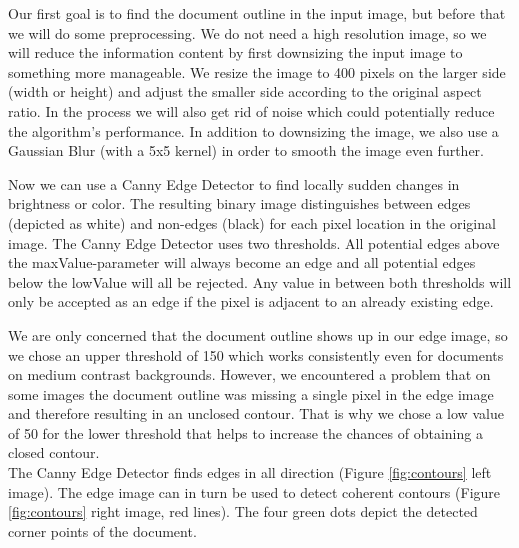 \documentclass[bibliography=totoc]{scrartcl}
\begin{document}
Our first goal is to find the document outline in the input image, but before that we will do some preprocessing.
We do not need a high resolution image, so we will reduce the information content by first downsizing the input image to something more manageable.
We resize the image to 400 pixels on the larger side (width or height) and adjust the smaller side according to the original aspect ratio.
In the process we will also get rid of noise which could potentially reduce the algorithm's performance.
In addition to downsizing the image, we also use a Gaussian Blur (with a 5x5 kernel) in order to smooth the image even further.

Now we can use a Canny Edge Detector to find locally sudden changes in brightness or color.
The resulting binary image distinguishes between edges (depicted as white) and non-edges (black) for each pixel location in the original image.
The Canny Edge Detector uses two thresholds.
All potential edges above the maxValue-parameter will always become an edge and all potential edges below the lowValue will all be rejected.
Any value in between both thresholds will only be accepted as an edge if the pixel is adjacent to an already existing edge. \cite{Canny}

We are only concerned that the document outline shows up in our edge image, so we chose an upper threshold of 150 which works consistently even for documents on medium contrast backgrounds.
However, we encountered a problem that on some images the document outline was missing a single pixel in the edge image and therefore resulting in an unclosed contour.
That is why we chose a low value of 50 for the lower threshold that helps to increase the chances of obtaining a closed contour.\\
The Canny Edge Detector finds edges in all direction (Figure \ref{fig:contours} left image). The edge image can in turn be used to detect coherent contours (Figure \ref{fig:contours} right image, red lines). The four green dots depict the detected corner points of the document.
\end{document}
